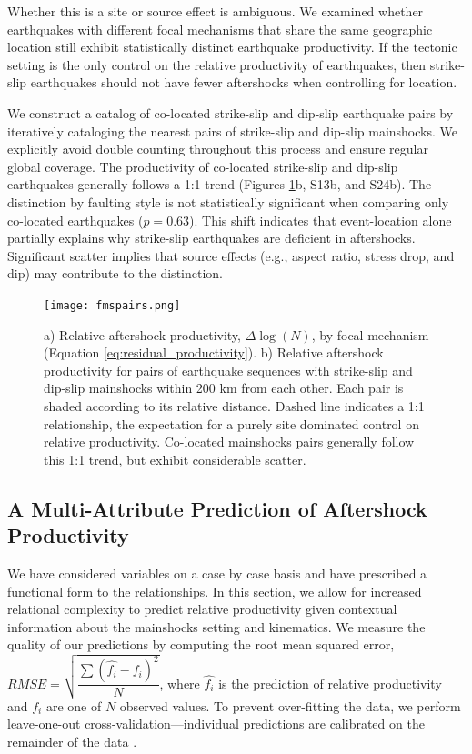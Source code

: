 \documentclass[draft, jgrga]{agujournal2018}
\begin{document}
    Whether this is a site or source effect is ambiguous. We examined whether earthquakes with different focal mechanisms that share the same geographic location still exhibit statistically distinct earthquake productivity. If the tectonic setting is the only control on the relative productivity of earthquakes, then strike-slip earthquakes should not have fewer aftershocks when controlling for location.

    We construct a catalog of co-located strike-slip and dip-slip earthquake pairs by iteratively cataloging the nearest pairs of strike-slip and dip-slip mainshocks. We explicitly avoid double counting throughout this process and ensure regular global coverage. The productivity of co-located strike-slip and dip-slip earthquakes generally follows a 1:1 trend (Figures \ref{fig:coloc}b, S13b, and S24b). The distinction by faulting style is not statistically significant when comparing only co-located earthquakes ($p = 0.63$). This shift indicates that event-location alone partially explains why strike-slip earthquakes are deficient in aftershocks. Significant scatter implies that source effects (e.g., aspect ratio, stress drop, and dip) may contribute to the distinction.

    \begin{figure}
        \centering
        \texttt{[image: fmspairs.png]}
        \caption{a) Relative aftershock productivity, $\Delta \log(N)$, by focal mechanism (Equation \ref{eq:residual_productivity}). b) Relative aftershock productivity for pairs of earthquake sequences with strike-slip and dip-slip mainshocks within 200 km from each other. Each pair is shaded according to its relative distance. Dashed line indicates a 1:1 relationship, the expectation for a purely site dominated control on relative productivity. Co-located mainshocks pairs generally follow this 1:1 trend, but exhibit considerable scatter.}
        \label{fig:coloc}
    \end{figure}

    \subsection{A Multi-Attribute Prediction of Aftershock Productivity}

    We have considered variables on a case by case basis and have prescribed a functional form to the relationships. In this section, we allow for increased relational complexity to predict relative productivity given contextual information about the mainshocks setting and kinematics. We measure the quality of our predictions by computing the root mean squared error, $RMSE = \sqrt{\dfrac{\sum{(\hat{f_i}-f_i)^2}}{N}}$, where $\hat{f_i}$ is the prediction of relative productivity and $f_i$ are one of $N$ observed values. To prevent over-fitting the data, we perform leave-one-out cross-validation---individual predictions are calibrated on the remainder of the data \citep{witten2011}.
\end{document}

